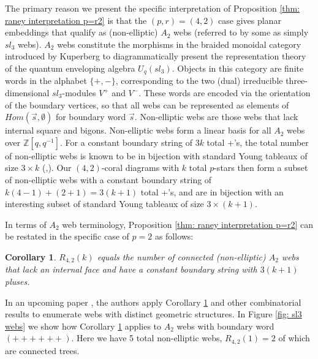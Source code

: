 \documentclass[documentfleqn,12pt]{amsart}
\newtheorem{corollary}[theorem]{Corollary}
\def\Z{\mathbb{Z}}
\begin{document}
The primary reason we present the specific interpretation of Proposition \ref{thm: raney interpretation p=r2} is that the $(p,r)=(4,2)$ case gives planar embeddings that qualify as (non-elliptic) $A_2$ webs (referred to by some as simply $sl_3$ webs).  $A_2$ webs constitute the morphisms in the braided monoidal category introduced by Kuperberg \cite{Kup} to diagrammatically present the representation theory of the quantum enveloping algebra $U_q(sl_3)$.  Objects in this category are finite words in the alphabet $\lbrace +,-\rbrace$, corresponding to the two (dual) irreducible three-dimensional $sl_3$-modules $V^+$ and $V^-$.  These words are encoded via the orientation of the boundary vertices, so that all webs can be represented as elements of $Hom(\vec{s},\emptyset)$ for boundary word $\vec{s}$.  Non-elliptic webs are those webs that lack internal square and bigons.  Non-elliptic webs form a linear basis for all $A_2$ webs over $\Z[q,q^{-1}]$.  For a constant boundary string of $3k$ total +'s, the total number of non-elliptic webs is known to be in bijection with standard Young tableaux of size $3 \times k$ (\cite{PPS},\cite{Tym}).  Our $(4,2)$-coral diagrams with $k$ total $p$-stars then form a subset of non-elliptic webs with a constant boundary string of $k(4-1) + (2+1) = 3(k+1)$ total +'s, and are in bijection with an interesting subset of standard Young tableaux of size $3 \times (k+1)$.

In terms of $A_2$ web terminology, Proposition \ref{thm: raney interpretation p=r2} can be restated in the specific case of $p=2$ as follows:

\begin{corollary}
\label{thm: sl3 webs, constant string}
$R_{4,2}(k)$ equals the number of connected (non-elliptic) $A_2$ webs that lack an internal face and have a constant boundary string with $3(k+1)$ pluses.
\end{corollary}

In an upcoming paper \cite{BD}, the authors apply Corollary \ref{thm: sl3 webs, constant string} and other combinatorial results to enumerate webs with distinct geometric structures.  In Figure \ref{fig: sl3 webs} we show how Corollary \ref{thm: sl3 webs, constant string} applies to $A_2$ webs with boundary word $(++++++)$.  Here we have 5 total non-elliptic webs, $R_{4,2}(1)=2$ of which are connected trees.
\end{document}

